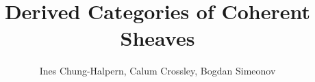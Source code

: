 \documentclass{article}
\title{Derived Categories of Coherent Sheaves}
\author{Ines Chung-Halpern, Calum Crossley, Bogdan Simeonov}
\date{}
\begin{document}




\newpage
\sloppy
\printbibliography
\end{document}
